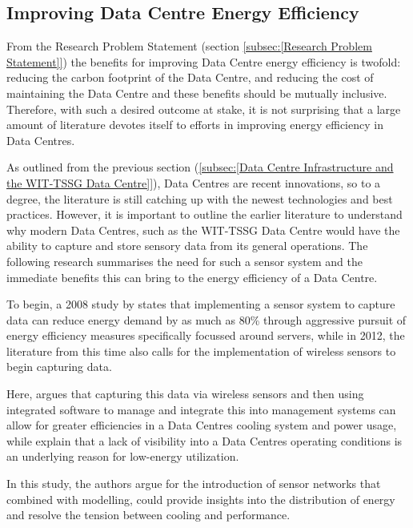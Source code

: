 \documentclass[12pt]{scrartcl}
\begin{document}
\subsection{Improving Data Centre Energy Efficiency}
\label{subsec:[Improving Data Centre Energy Efficiency]}
From the Research Problem Statement (section \ref{subsec:[Research Problem Statement]}) the benefits for improving Data Centre energy efficiency is twofold: reducing the carbon footprint of the Data Centre, and reducing the cost of maintaining the Data Centre and these benefits should be mutually inclusive. Therefore, with such a desired outcome at stake, it is not surprising that a large amount of literature devotes itself to efforts in improving energy efficiency in Data Centres.

As outlined from the previous section (\ref{subsec:[Data Centre Infrastructure and the WIT-TSSG Data Centre]}), Data Centres are recent innovations, so to a degree, the literature is still catching up with the newest technologies and best practices. However, it is important to outline the earlier literature to understand why modern Data Centres, such as the WIT-TSSG Data Centre would have the ability to capture and store sensory data from its general operations. The following research summarises the need for such a sensor system and the immediate benefits this can bring to the energy efficiency of a Data Centre.   

To begin, a 2008 study by \citet{edsbas.A50BA51A20120101} states that implementing a sensor system to capture data can reduce energy demand by as much as 80\% through aggressive pursuit of energy efficiency measures specifically focussed around servers, while in 2012, the literature from this time also calls for the implementation of wireless sensors to begin capturing data. 

Here, \citet{edssch.qt9c84f49g20130101} argues that capturing this data via wireless sensors and then using integrated software to manage and integrate this into management systems can allow for greater efficiencies in a Data Centres cooling system and power usage, while \citet{edsjsr.4134817120120101} explain that a lack of visibility into a Data Centres operating conditions is an underlying reason for low-energy utilization. 

In this study, the authors argue for the introduction of sensor networks that combined with modelling, could provide insights into the distribution of energy and resolve the tension between cooling and performance.    
\end{document}
